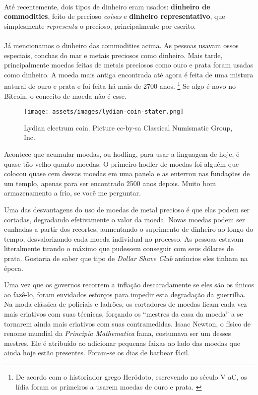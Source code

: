 \paragraph{}
Até recentemente, dois tipos de dinheiro eram usados: \textbf{dinheiro de commodities}, 
feito de precioso \textit{coisas} e \textbf{dinheiro representativo}, que simplesmente 
\textit{representa} o precioso, principalmente por escrito.

\paragraph{}
Já mencionamos o dinheiro das commodities acima. As pessoas usavam ossos especiais, 
conchas do mar e metais preciosos como dinheiro. Mais tarde, principalmente moedas 
feitas de metais preciosos como ouro e prata foram usadas como dinheiro. A moeda 
mais antiga encontrada até agora é feita de uma mistura natural de ouro e prata e 
foi feita há mais de 2700 anos. \footnote{De acordo com o historiador grego 
Heródoto, escrevendo no século V aC, os lídia foram os primeiros a usarem moedas 
de ouro e prata. \cite{coinage-origins}} Se algo é novo no Bitcoin, 
o conceito de moeda não é esse.

\newpage

\begin{figure}
  \centering
  \texttt{[image: assets/images/lydian-coin-stater.png]}
  \caption{Lydian electrum coin. Picture cc-by-sa Classical Numismatic Group, Inc.}
  \label{fig:lydian-coin-stater}
\end{figure}

Acontece que acumular moedas, ou hodling, para usar a linguagem de hoje, é quase 
tão velho quanto moedas. O primeiro hodler de moedas foi alguém que colocou quase 
cem dessas moedas em uma panela e as enterrou nas fundações de um templo, apenas 
para ser encontrado 2500 anos depois. Muito bom armazenamento a frio, se você 
me perguntar.

Uma das desvantagens do uso de moedas de metal precioso é que elas podem ser cortadas, 
degradando efetivamente o valor da moeda. Novas moedas podem ser cunhadas a partir dos 
recortes, aumentando o suprimento de dinheiro ao longo do tempo, desvalorizando cada 
moeda individual no processo. As pessoas estavam literalmente tirando o máximo que 
pudessem conseguir com seus dólares de prata.
Gostaria de saber que tipo de \textit{Dollar Shave Club} anúncios eles tinham na época.

Uma vez que os governos recorrem a inflação descaradamente se eles são os únicos ao fazê-lo, 
foram envidados esforços para impedir esta degradação da guerrilha. Na moda clássica de 
policiais e ladrões, os cortadores de moedas ficam cada vez mais criativos com suas técnicas, 
forçando os \enquote{mestres da casa da moeda} a se tornarem ainda mais criativos com suas 
contramedidas. Isaac Newton, o físico de renome mundial da \textit {Principia Mathematica} 
fama, costumava ser um desses mestres. Ele é atribuído ao adicionar pequenas faixas ao lado 
das moedas que ainda hoje estão presentes. Foram-se os dias de barbear fácil.

